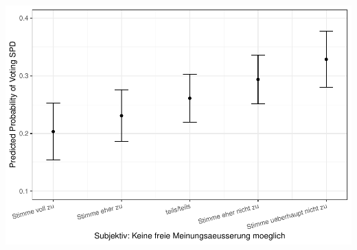 \documentclass[
]{article}
\begin{document}
\includegraphics{AVCD_Final_Assignment-Edenhofer_files/figure-latex/spd-cancel-culture-1.pdf}
\end{document}
